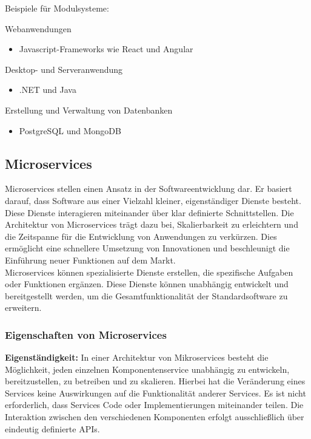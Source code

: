 Beispiele für Modulsysteme:

Webanwendungen
\begin{itemize}
    \item Javascript-Frameworks wie React und Angular
\end{itemize}

Desktop- und Serveranwendung
\begin{itemize}
    \item .NET und Java
\end{itemize}

Erstellung und Verwaltung von Datenbanken
\begin{itemize}
    \item PostgreSQL und MongoDB
\end{itemize}

\cite{modulsystem}

\newpage
\subsection*{Microservices}

Microservices stellen einen Ansatz in der Softwareentwicklung dar. Er basiert darauf, 
dass Software aus einer Vielzahl kleiner, eigenständiger Dienste besteht. 
Diese Dienste interagieren miteinander über klar definierte Schnittstellen.
Die Architektur von Microservices trägt dazu bei, Skalierbarkeit zu erleichtern und die 
Zeitspanne für die Entwicklung von Anwendungen zu verkürzen. 
Dies ermöglicht eine schnellere Umsetzung von Innovationen und beschleunigt die Einführung 
neuer Funktionen auf dem Markt.
\\
Microservices können spezialisierte Dienste erstellen, die spezifische Aufgaben oder 
Funktionen ergänzen. Diese Dienste können unabhängig entwickelt und bereitgestellt werden, 
um die Gesamtfunktionalität der Standardsoftware zu erweitern. 
\cite{microservices}

\subsubsection*{Eigenschaften von Microservices}

\textbf{Eigenständigkeit:}
In einer Architektur von Mikroservices besteht die Möglichkeit, jeden einzelnen Komponentenservice 
unabhängig zu entwickeln, bereitzustellen, zu betreiben und zu skalieren. 
Hierbei hat die Veränderung eines Services keine Auswirkungen auf die Funktionalität anderer Services. 
Es ist nicht erforderlich, dass Services Code oder Implementierungen miteinander teilen. 
Die Interaktion zwischen den verschiedenen Komponenten erfolgt ausschließlich 
über eindeutig definierte APIs.
\cite{microservices}

